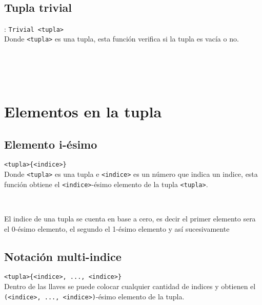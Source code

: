       \begin{fxcode}
         \\
      \end{fxcode}
      
      \subsection*{Tupla trivial}: \texttt{Trivial <tupla>}\\
      Donde \texttt{<tupla>} es una tupla, esta función verifica si la tupla es vacía o no.
      
      \begin{fxcode}
         \\
         \\
         \\
      \end{fxcode}
   
   \section{Elementos en la tupla}
      \subsection*{Elemento i-ésimo} \texttt{<tupla>\{<indice>\}}\\
      Donde \texttt{<tupla>} es una tupla e \texttt{<indice>} es un número que indica un indice, esta función obtiene el \texttt{<indice>}-ésimo elemento de la tupla \texttt{<tupla>}.
      
      \begin{fxcode}
         \\
      \end{fxcode}
      
      El indice de una tupla se cuenta en base a cero, es decir el primer elemento sera el 0-ésimo elemento, el segundo el 1-ésimo elemento y así sucesivamente
      
      \subsection*{Notación multi-indice} \texttt{<tupla>\{<indice>, ..., <indice>\}}\\
      Dentro de las llaves se puede colocar cualquier cantidad de indices y obtienen el \texttt{(<indice>, ..., <indice>)}-ésimo elemento de la tupla.
      
